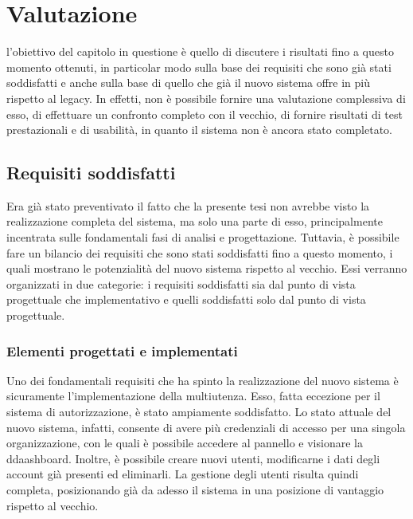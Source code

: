 \chapter{Valutazione}

l'obiettivo del capitolo in questione è quello di discutere i risultati fino a questo momento ottenuti, in particolar modo sulla base dei requisiti che sono già stati soddisfatti e anche sulla base di quello che già il nuovo sistema offre in più rispetto al legacy. In effetti, non è possibile fornire una valutazione complessiva di esso, di effettuare un confronto completo con il vecchio, di fornire risultati di test prestazionali e di usabilità, in quanto il sistema non è ancora stato completato.

\section{Requisiti soddisfatti}
Era già stato preventivato il fatto che la presente tesi non avrebbe visto la realizzazione completa del sistema, ma solo una parte di esso, principalmente incentrata sulle fondamentali fasi di analisi e progettazione. Tuttavia, è possibile fare un bilancio dei requisiti che sono stati soddisfatti fino a questo momento, i quali mostrano le potenzialità del nuovo sistema rispetto al vecchio. Essi verranno organizzati in due categorie: i requisiti soddisfatti sia dal punto di vista progettuale che implementativo e quelli soddisfatti solo dal punto di vista progettuale.

\subsection{Elementi progettati e implementati}
Uno dei fondamentali requisiti che ha spinto la realizzazione del nuovo sistema è sicuramente l'implementazione della multiutenza. Esso, fatta eccezione per il sistema di autorizzazione, è stato ampiamente soddisfatto. Lo stato attuale del nuovo sistema, infatti, consente di avere più credenziali di accesso per una singola organizzazione, con le quali è possibile accedere al pannello e visionare la ddaashboard. Inoltre, è possibile creare nuovi utenti, modificarne i dati degli account già presenti ed eliminarli. La gestione degli utenti risulta quindi completa, posizionando già da adesso il sistema in una posizione di vantaggio rispetto al vecchio.

